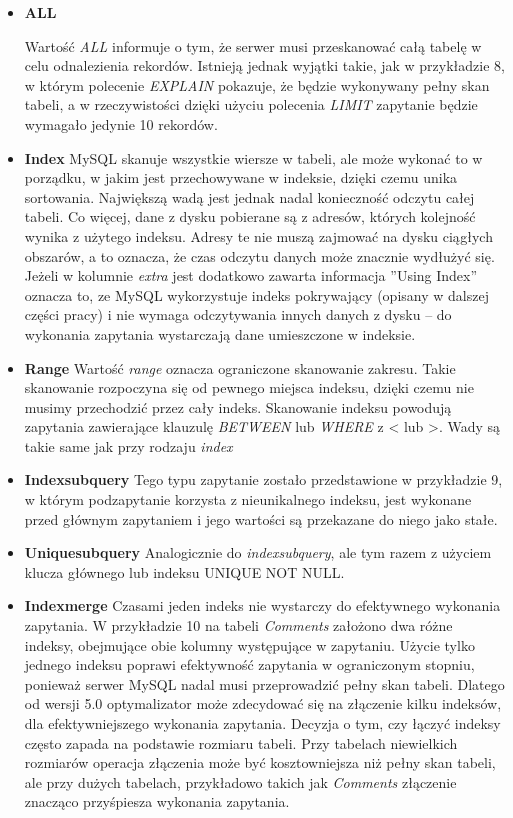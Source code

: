 \begin{itemize}
	\item \textbf{ALL} 
	
	\newline	Wartość \textit{ALL} informuje o tym, że serwer musi przeskanować całą tabelę w celu odnalezienia rekordów. Istnieją jednak wyjątki takie, jak w przykładzie 8, w którym polecenie \textit{EXPLAIN} pokazuje, że będzie wykonywany pełny skan tabeli, a w rzeczywistości dzięki użyciu polecenia \textit{LIMIT} zapytanie będzie wymagało jedynie 10 rekordów.
	\item \textbf{Index} 
	\newline MySQL skanuje wszystkie wiersze w tabeli, ale może wykonać to w porządku, w jakim jest przechowywane w indeksie, dzięki czemu unika sortowania. Największą wadą jest jednak nadal konieczność odczytu całej tabeli. Co więcej, dane z dysku pobierane są z adresów, których kolejność wynika z użytego indeksu. Adresy te nie muszą zajmować na dysku ciągłych obszarów, a to oznacza, że czas odczytu danych może znacznie wydłużyć się. Jeżeli w kolumnie \textit{extra} jest dodatkowo zawarta informacja ''Using Index'' oznacza to, ze MySQL wykorzystuje indeks pokrywający (opisany w dalszej części pracy) i nie wymaga odczytywania innych danych z dysku – do wykonania zapytania wystarczają dane umieszczone w indeksie.
	\item \textbf{Range} \newline
	Wartość \textit{range} oznacza ograniczone skanowanie zakresu. Takie skanowanie rozpoczyna się od pewnego miejsca indeksu, dzięki czemu nie musimy przechodzić przez cały indeks. Skanowanie indeksu powodują zapytania zawierające klauzulę \textit{BETWEEN} lub \textit{WHERE} z < lub >. Wady są takie same jak przy rodzaju \textit{index}
	\item \textbf{Index\textunderscore subquery} \newline Tego typu zapytanie zostało przedstawione w przykładzie 9, w którym podzapytanie korzysta z nieunikalnego indeksu, jest wykonane przed głównym zapytaniem i jego wartości są przekazane do niego jako stałe.
	\item\textbf{Unique\textunderscore subquery} \newline Analogicznie do \textit{index\textunderscore subquery}, ale tym razem z użyciem klucza głównego lub indeksu UNIQUE NOT NULL.
	\item \textbf{Index\textunderscore merge}
\newline Czasami jeden indeks nie wystarczy do efektywnego wykonania zapytania. W  przykładzie 10 na tabeli \textit{Comments} założono dwa różne indeksy, obejmujące obie kolumny występujące w zapytaniu. Użycie tylko jednego indeksu poprawi  efektywność zapytania w ograniczonym stopniu, ponieważ serwer MySQL nadal musi przeprowadzić pełny skan tabeli. Dlatego od wersji 5.0 optymalizator może zdecydować się na złączenie kilku indeksów, dla efektywniejszego wykonania zapytania. Decyzja o tym, czy łączyć indeksy często zapada na podstawie rozmiaru tabeli. Przy tabelach niewielkich rozmiarów operacja złączenia może być kosztowniejsza niż pełny skan tabeli, ale przy dużych tabelach, przykładowo takich jak \textit{Comments} złączenie znacząco przyśpiesza wykonania zapytania. 

\end{itemize}
